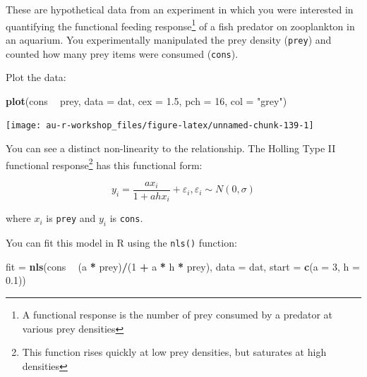 \documentclass[]{book}
\newenvironment{Shaded}{\begin{snugshade}}{\end{snugshade}}
\newcommand{\KeywordTok}[1]{\textcolor[rgb]{0.13,0.29,0.53}{\textbf{#1}}}
\newcommand{\DataTypeTok}[1]{\textcolor[rgb]{0.13,0.29,0.53}{#1}}
\newcommand{\DecValTok}[1]{\textcolor[rgb]{0.00,0.00,0.81}{#1}}
\newcommand{\FloatTok}[1]{\textcolor[rgb]{0.00,0.00,0.81}{#1}}
\newcommand{\StringTok}[1]{\textcolor[rgb]{0.31,0.60,0.02}{#1}}
\newcommand{\OperatorTok}[1]{\textcolor[rgb]{0.81,0.36,0.00}{\textbf{#1}}}
\newcommand{\NormalTok}[1]{#1}
\let\rmarkdownfootnote\footnote%
\def\footnote{\protect\rmarkdownfootnote}
\theoremstyle{definition}
\theoremstyle{definition}
\theoremstyle{definition}
\theoremstyle{remark}
\begin{document}
These are hypothetical data from an experiment in which you were
interested in quantifying the functional feeding response\footnote{A
  functional response is the number of prey consumed by a predator at
  various prey densities} of a fish predator on zooplankton in an
aquarium. You experimentally manipulated the prey density
(\texttt{prey}) and counted how many prey items were consumed
(\texttt{cons}).

Plot the data:

\begin{Shaded}
\begin{Highlighting}[]
\KeywordTok{plot}\NormalTok{(cons }\OperatorTok{~}\StringTok{ }\NormalTok{prey, }\DataTypeTok{data =}\NormalTok{ dat, }\DataTypeTok{cex =} \FloatTok{1.5}\NormalTok{, }\DataTypeTok{pch =} \DecValTok{16}\NormalTok{, }\DataTypeTok{col =} \StringTok{"grey"}\NormalTok{)}
\end{Highlighting}
\end{Shaded}

\begin{center}\texttt{[image: au-r-workshop\_files/figure-latex/unnamed-chunk-139-1]} \end{center}

You can see a distinct non-linearity to the relationship. The Holling
Type II functional response\footnote{This function rises quickly at low
  prey densities, but saturates at high densities} has this functional
form:

\begin{equation}
  y_i=\frac{ax_i}{1+ahx_i} + \varepsilon_i, \varepsilon_i \sim N(0, \sigma)
\label{eq:func-resp}
\end{equation}

where \(x_i\) is \texttt{prey} and \(y_i\) is \texttt{cons}.

You can fit this model in R using the \texttt{nls()} function:

\begin{Shaded}
\begin{Highlighting}[]
\NormalTok{fit =}\StringTok{ }\KeywordTok{nls}\NormalTok{(cons }\OperatorTok{~}\StringTok{ }\NormalTok{(a }\OperatorTok{*}\StringTok{ }\NormalTok{prey)}\OperatorTok{/}\NormalTok{(}\DecValTok{1} \OperatorTok{+}\StringTok{ }\NormalTok{a }\OperatorTok{*}\StringTok{ }\NormalTok{h }\OperatorTok{*}\StringTok{ }\NormalTok{prey), }\DataTypeTok{data =}\NormalTok{ dat,}
          \DataTypeTok{start =} \KeywordTok{c}\NormalTok{(}\DataTypeTok{a =} \DecValTok{3}\NormalTok{, }\DataTypeTok{h =} \FloatTok{0.1}\NormalTok{))}
\end{Highlighting}
\end{Shaded}
\end{document}
